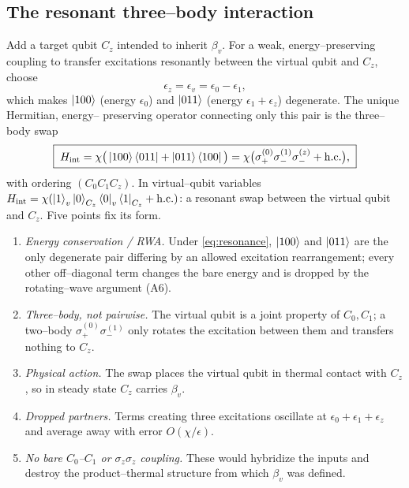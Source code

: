 \documentclass[11pt,a4paper]{article}
\theoremstyle{plain}
\theoremstyle{definition}
\theoremstyle{remark}
\begin{document}
\subsection{The resonant three--body interaction}
\label{sec:interaction}
Add a target qubit $C_z$ intended to inherit $\beta_v$. For a weak,
energy--preserving coupling to transfer excitations resonantly between
the virtual qubit and $C_z$, choose
\begin{equation}
\boxed{\;\epsilon_z=\epsilon_v=\epsilon_0-\epsilon_1,\;}
\label{eq:resonance}
\end{equation}
which makes $\ket{100}$ (energy $\epsilon_0$) and $\ket{011}$ (energy
$\epsilon_1+\epsilon_z$) degenerate. The unique Hermitian, energy--
preserving operator connecting only this pair is the three--body swap
\begin{equation}
\boxed{\;
H_{\mathrm{int}}
=\chi\big(\ket{100}\bra{011}+\ket{011}\bra{100}\big)
=\chi\big(\sigma_+^{(0)}\sigma_-^{(1)}\sigma_-^{(z)}+\mathrm{h.c.}\big),
\;}
\label{eq:Hint}
\end{equation}
with ordering $(C_0C_1C_z)$. In virtual--qubit variables
$H_{\mathrm{int}}=\chi(\ket{1}_v\ket{0}_{C_z}\bra{0}_v\bra{1}_{C_z}
+\mathrm{h.c.})$: a resonant swap between the virtual qubit and $C_z$.
Five points fix its form.
\begin{enumerate}[label=(\roman*),leftmargin=*]
\item \emph{Energy conservation / RWA.} Under \eqref{eq:resonance},
$\ket{100}$ and $\ket{011}$ are the only degenerate pair differing by an
allowed excitation rearrangement; every other off--diagonal term changes
the bare energy and is dropped by the rotating--wave argument (A6).
\item \emph{Three--body, not pairwise.} The virtual qubit is a joint
property of $C_0,C_1$; a two--body $\sigma_+^{(0)}\sigma_-^{(1)}$ only
rotates the excitation between them and transfers nothing to $C_z$.
\item \emph{Physical action.} The swap places the virtual qubit in
thermal contact with $C_z$, so in steady state $C_z$ carries $\beta_v$.
\item \emph{Dropped partners.} Terms creating three excitations oscillate
at $\epsilon_0+\epsilon_1+\epsilon_z$ and average away with error
$O(\chi/\epsilon)$.
\item \emph{No bare $C_0$--$C_1$ or $\sigma_z\sigma_z$ coupling.} These
would hybridize the inputs and destroy the product--thermal structure
from which $\beta_v$ was defined.
\end{enumerate}
\end{document}
